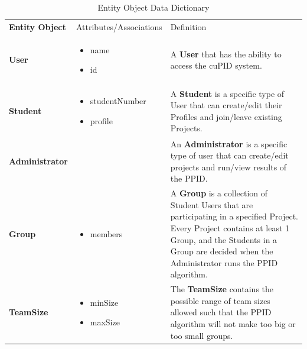 \documentclass[12pt,letterpaper]{article}
\begin{document}
\begin{table}[H]
	\caption{Entity Object Data Dictionary}
	\begin{tabu} to 
		\tableheader{}Entity Object & Attributes/\newline Associations & Definition\\
		User & 
		\begin{minipage}[t]{\linewidth}
			\begin{itemize}
				\item name
				\item id
			\end{itemize}
		\end{minipage} & 
		A \textbf{User} that has the ability to access the cuPID system.\\
		
		Student & 
		\begin{minipage}[t]{\linewidth}
			\begin{itemize}
				\item studentNumber
				\item profile
			\end{itemize}
		\end{minipage} & 
		A \textbf{Student} is a specific type of User that can create/edit their Profiles and join/leave existing Projects.\\
		
		Administrator & 
		&
		An \textbf{Administrator} is a specific type of user that can create/edit projects and run/view results of the PPID.\\

		Group & 
		\begin{minipage}[t]{\linewidth}
			\begin{itemize}
				\item members
			\end{itemize}
		\end{minipage} & 
		A \textbf{Group} is a collection of Student Users that are participating in a specified Project. Every Project contains at least 1 Group, and the Students in a Group are decided when the Administrator runs the PPID algorithm.\\

		TeamSize & 
		\begin{minipage}[t]{\linewidth}
			\begin{itemize}
				\item minSize
				\item maxSize
			\end{itemize}
		\end{minipage} & 
		The \textbf{TeamSize} contains the possible range of team sizes allowed such that the PPID algorithm will not make too big or too small groups.\\


\end{tabu}
\end{table}
\end{document}
